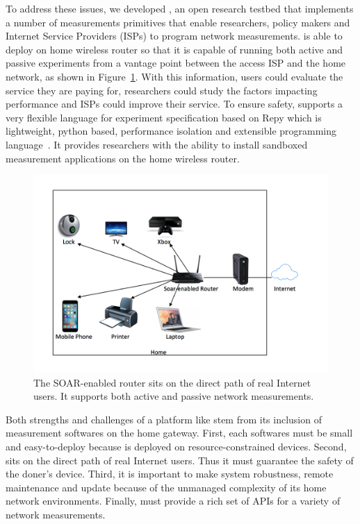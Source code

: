To address these issues, we developed \sysname, an open research testbed that implements a number of measurements primitives that enable researchers, policy makers and Internet Service Providers (ISPs) to program network measurements. \sysname is able to deploy on home wireless router so that it is capable of running both active and passive experiments from a vantage point between the access ISP and the home network, as shown in Figure~\ref{figure:design}. With this information, users could evaluate the service they are paying for, researchers could study the factors impacting performance and ISPs could improve their service. To ensure safety, \sysname supports a very flexible language for experiment specification based on Repy which is lightweight, python based, performance isolation and extensible programming language~\cite{cappos2010retaining}. It provides researchers with the ability to install sandboxed measurement applications on the home wireless router. 

\begin{figure}%
\centering
\includegraphics[width=0.8\columnwidth]{figure/home-network.png}
\caption{The SOAR-enabled router sits on the direct path of real 
Internet users. It supports both active and passive network measurements.}
\label{figure:design}
\end{figure}

Both strengths and challenges of a platform like \sysname stem from 
its inclusion of measurement softwares on the home gateway. First, each softwares must be small and easy-to-deploy because \sysname is deployed on resource-constrained devices. Second, \sysname sits on the direct path of real Internet users. Thus it must guarantee the safety of the doner's device. Third, it is important to make system robustness, remote maintenance and update because of the unmanaged complexity of its home network environments. Finally, \sysname must provide a rich set of APIs for a variety of network measurements.

